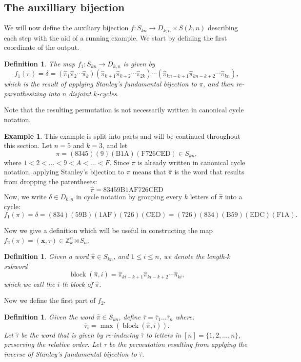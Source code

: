 \documentclass{article}
\numberwithin{theorem}{section}
\newtheorem{definition}[theorem]{Definition}
\theoremstyle{definition}
\newtheorem{example}{Example}
\newcommand{\block}{\operatorname{block}}
\begin{document}
\subsection{The auxilliary bijection}
We will now define the auxiliary bijection $f \colon S_{kn} \to D_{k,n} \times S(k,n)$ describing each step with the aid of a running example. We start by defining the first coordinate of the output.
\begin{definition}
    The map $f_1\colon S_{kn} \to D_{k,n}$ is given by \[
        f_1(\pi) = \delta = (\hat\pi_1\hat\pi_2\cdots\hat\pi_k)
        (\hat\pi_{k+1}\hat\pi_{k+2}\cdots\hat\pi_{2k})
        \cdots
        (\hat\pi_{kn-k+1}\hat\pi_{kn-k+2}\cdots\hat\pi_{kn}),
    \]
    which is the result of applying Stanley's fundamental bijection to $\pi$, and then re-parenthesizing into $n$ disjoint $k$-cycles.
\end{definition}
Note that the resulting permutation is not necessarily written in canonical cycle notation.
\begin{example}
\label{ex:MainExample}
    This example is split into parts and will be continued throughout this section. Let $n=5$ and $k=3$, and let
    \[\pi = \mathrm{(8345)(9)(B1A)(F726CED)} \in S_{kn},\]
    where $1 < 2 < \dots < 9 < A < \dots < F$. Since $\pi$ is already written in canonical cycle notation, applying Stanley's bijection to $\pi$ means that $\hat\pi$ is the word that results from dropping the parentheses: \[
        \hat\pi = \mathrm{8345 9 B1A F726CED}
    \]
    Now, we write $\delta \in D_{k,n}$ in cycle notation by grouping every $k$ letters of $\hat\pi$ into a cycle: \[
        f_1(\pi) = \delta = \mathrm{(834)(59B)(1AF)(726)(CED)} = \mathrm{(726)(834)(B59)(EDC)(F1A)}.
    \]
\end{example}
Now we give a definition which will be useful in constructing the map $f_2(\pi) = (\mathbf{x},\tau) \in \mathbb{Z}_k^n \rtimes S_n$.
\begin{definition}
    Given a word $\hat\pi \in S_{kn}$, and $1 \leq i \leq n$, we denote the length-$k$ subword
    \[
        \block(\hat\pi,i) = \hat\pi_{ki-k+1} \hat\pi_{ki-k+2} \cdots \hat\pi_{ki},
    \]
    which we call the \em{$i$-th block} of $\hat\pi$.
\end{definition}
Now we define the first part of $f_2$.
\begin{definition}\label{def:tau}
    Given the word $\hat\pi\in S_{kn}$, define $\overline\tau = \overline\tau_1\dots\overline\tau_n$ where:
    \[
        \overline\tau_i = \max(\block(\hat\pi,i)).
    \]
    Let $\hat\tau$ be the word that is given by re-indexing $\overline\tau$ to letters in $[n]=\{1,2,\dots,n\}$, preserving the relative order.
    Let $\tau$ be the permutation resulting from applying the inverse of Stanley's fundamental bijection to $\hat\tau$.
\end{definition}
\end{document}
